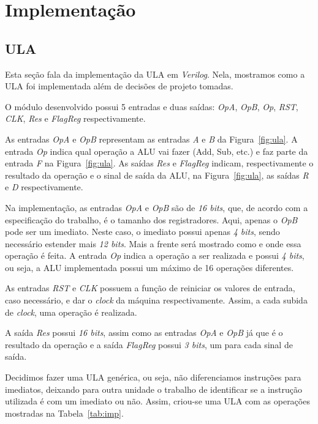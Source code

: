 \documentclass[11pt,a4paper,titlepage]{article}
\begin{document}
\section{Implementação}

\subsection{ULA}\label{subsec:imp-ula}
Esta seção fala da implementação da ULA em \textit{Verilog}.
Nela, mostramos como a ULA foi implementada além de decisões de projeto tomadas.

O módulo desenvolvido possui 5 entradas e duas saídas: \textit{OpA}, \textit{OpB}, \textit{Op}, \textit{RST}, \textit{CLK}, \textit{Res} e \textit{FlagReg} respectivamente.

As entradas \textit{OpA} e \textit{OpB} representam as entradas \textit{A} e \textit{B} da Figura~\ref{fig:ula}.
A entrada \textit{Op} indica qual operação a ALU vai fazer (Add, Sub, etc.) e faz parte da entrada \textit{F} na Figura~\ref{fig:ula}.
As saídas \textit{Res} e \textit{FlagReg} indicam, respectivamente o resultado da operação e o sinal de saída da ALU, na Figura~\ref{fig:ula}, as saídas \textit{R} e \textit{D} respectivamente.

Na implementação, as entradas \textit{OpA} e \textit{OpB} são de \textit{16 bits}, que, de acordo com a especificação do trabalho, é o tamanho dos registradores.
Aqui, apenas o \textit{OpB} pode ser um imediato.
Neste caso, o imediato possui apenas \textit{4 bits}, sendo necessário estender mais \textit{12 bits}.
Mais a frente será mostrado como e onde essa operação é feita.
A entrada \textit{Op} indica a operação a ser realizada e possui \textit{4 bits}, ou seja, a ALU implementada possui um máximo de 16 operações diferentes.

As entradas \textit{RST} e \textit{CLK} possuem a função de reiniciar os valores de entrada, caso necessário, e dar o \textit{clock} da máquina respectivamente.
Assim, a cada subida de \textit{clock}, uma operação é realizada.

A saída \textit{Res} possui \textit{16 bits}, assim como as entradas \textit{OpA} e \textit{OpB} já que é o resultado da operação e a saída \textit{FlagReg} possui \textit{3 bits}, um para cada sinal de saída.

Decidimos fazer uma ULA genérica, ou seja, não diferenciamos instruções para imediatos, deixando para outra unidade o trabalho de identificar se a instrução utilizada é com um imediato ou não.
Assim, criou-se uma ULA com as operações mostradas na Tabela~\ref{tab:imp}.
\end{document}
